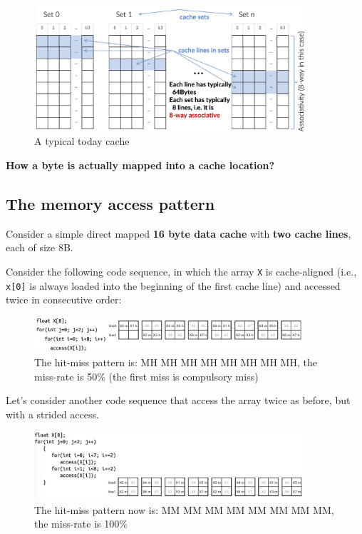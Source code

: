 \begin{figure}[H]
    \centering
    \includegraphics[width=0.9\textwidth]{assets/opt9.png}
    \caption{A typical today cache}
\end{figure}

\begin{advancedblock}
    \textbf{How a byte is actually mapped into a cache location?}


\end{advancedblock}

\subsection*{The memory access pattern}

Consider a simple direct mapped \textbf{16 byte data cache} with \textbf{two cache lines}, each of size 8B. 

Consider the following code sequence, in which the array \texttt{X} is cache-aligned (i.e., \texttt{x[0]} is always loaded into the beginning of the first cache line) and accessed twice in consecutive order:

\begin{figure}[H]
    \centering
    \includegraphics[width=0.9\textwidth]{assets/opt10.png}
    \caption{The hit-miss pattern is: MH MH MH MH MH MH MH MH, the miss-rate is 50\% (the first miss is compulsory miss)}
\end{figure}

Let's consider another code sequence that access the array twice as before, but with a strided access.

\begin{figure}[H]
    \centering
    \includegraphics[width=0.9\textwidth]{assets/opt11.png}
    \caption{The hit-miss pattern now is: MM MM MM MM MM MM MM MM, the miss-rate is 100\%}
\end{figure}

